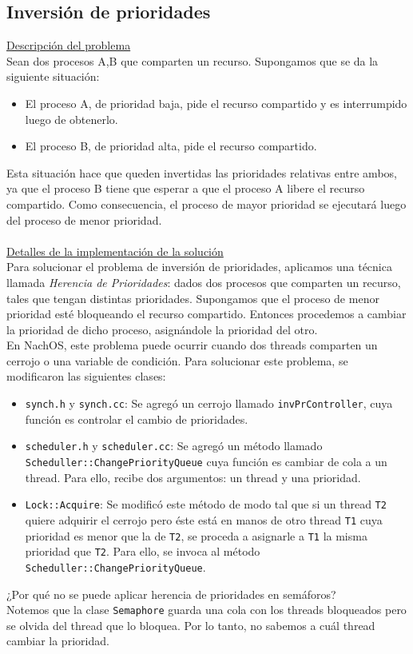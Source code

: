 \subsection*{Inversión de prioridades}
\textsf{\underline{Descripción del problema}}\\
Sean dos procesos A,B que comparten un recurso. Supongamos que se da la siguiente situación:
\begin{itemize}
    \item El proceso A, de prioridad baja, pide el recurso compartido y es interrumpido luego de obtenerlo.
    \item El proceso B, de prioridad alta, pide el recurso compartido.
\end{itemize}
Esta situación hace que queden invertidas las prioridades relativas entre ambos, ya que el proceso B tiene que esperar a que el proceso A libere el recurso compartido. Como consecuencia, el proceso de mayor prioridad se ejecutará luego del proceso de menor prioridad.\\
\\\textsf{\underline{Detalles de la implementación de la solución}}\\
Para solucionar el problema de inversión de prioridades, aplicamos una técnica llamada \emph{Herencia de Prioridades}: dados dos procesos que comparten un recurso, tales que tengan distintas prioridades. Supongamos que el proceso de menor prioridad esté bloqueando el recurso compartido. Entonces procedemos a cambiar la prioridad de dicho proceso, asignándole la prioridad del otro.\\
En NachOS, este problema puede ocurrir cuando dos threads comparten un cerrojo o una variable de condición. Para solucionar este problema, se modificaron las siguientes clases:
\begin{itemize}
    \item \texttt{synch.h} y \texttt{synch.cc}: Se agregó un cerrojo llamado \texttt{invPrController}, cuya función es controlar el cambio de prioridades.
    \item \texttt{scheduler.h} y \texttt{scheduler.cc}: Se agregó un método llamado \texttt{Scheduller::ChangePriorityQueue} cuya función es cambiar de cola a un thread. Para ello, recibe dos argumentos: un thread y una prioridad.
    \item \texttt{Lock::Acquire}: Se modificó este método de modo tal que si un thread \texttt{T2} quiere adquirir el cerrojo pero éste está en manos de otro thread \texttt{T1} cuya prioridad es menor que la de \texttt{T2}, se proceda a asignarle a \texttt{T1} la misma prioridad que \texttt{T2}. Para ello, se invoca al método \texttt{Scheduller::ChangePriorityQueue}.
\end{itemize}
¿Por qué no se puede aplicar herencia de prioridades en semáforos?\\
Notemos que la clase \texttt{Semaphore} guarda una cola con los threads bloqueados pero se olvida del thread que lo bloquea. Por lo tanto, no sabemos a cuál thread cambiar la prioridad.